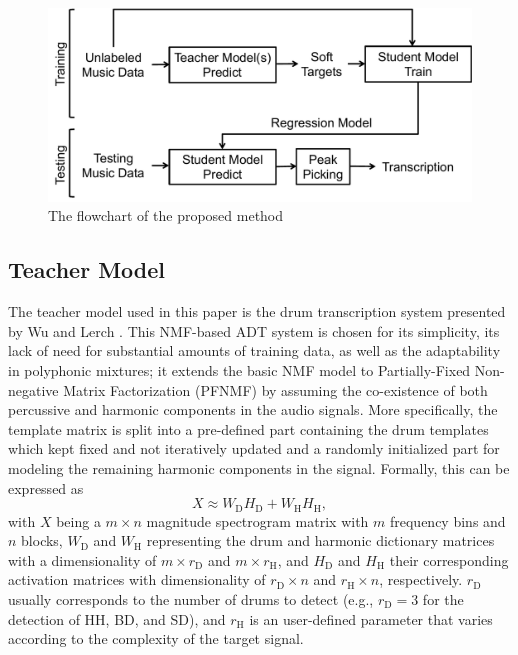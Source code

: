 \documentclass{article}
\begin{document}
\begin{figure}
\centering
\includegraphics[width = \columnwidth]{./figs/flowchart.pdf}
\caption{The flowchart of the proposed method}
\label{fig:flowchart}
\end{figure}

\subsection{Teacher Model}
The teacher model used in this paper is the drum transcription system presented by Wu and Lerch \cite{Wu2015a}. This NMF-based ADT system is chosen for its simplicity, its lack of need for substantial amounts of training data, as well as the adaptability in polyphonic mixtures; it extends the basic NMF model to Partially-Fixed Non-negative Matrix Factorization (PFNMF) by assuming the co-existence of both percussive and harmonic components in the audio signals. More specifically, the template matrix is split into a pre-defined part containing the drum templates which kept fixed and not iteratively updated and a randomly initialized part for modeling the remaining harmonic components in the signal. Formally, this can be expressed as 
\begin{equation}
    X \approx W_\mathrm{D}H_\mathrm{D} + W_\mathrm{H}H_\mathrm{H}, 
\end{equation}
with $X$ being a $m \times n$ magnitude spectrogram matrix with $m$ frequency bins and $n$ blocks, $W_\mathrm{D}$ and $W_\mathrm{H}$ representing the drum and harmonic dictionary matrices with a dimensionality of $m \times r_\mathrm{D}$ and $m \times r_\mathrm{H}$, and $H_\mathrm{D}$ and $H_\mathrm{H}$ their corresponding activation matrices with dimensionality of $r_\mathrm{D} \times n$ and $r_\mathrm{H} \times n$, respectively. $r_\mathrm{D}$ usually corresponds to the number of drums to detect (e.g., $r_\mathrm{D} = 3$ for the detection of HH, BD, and SD), and $r_\mathrm{H}$ is an user-defined parameter that varies according to the complexity of the target signal. 
\end{document}
